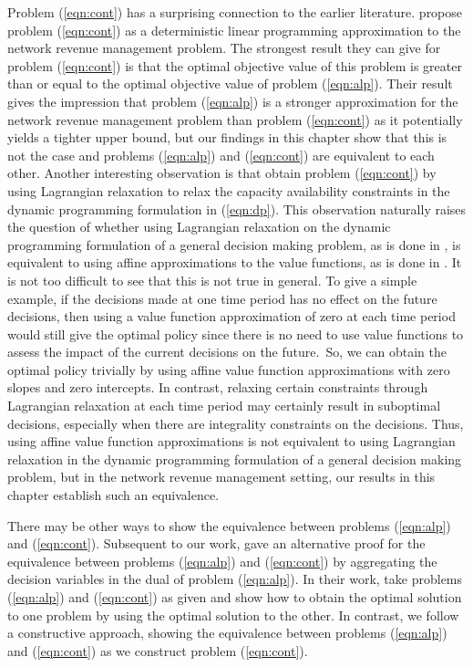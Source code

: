 Problem (\ref{eqn:cont}) has a surprising connection to the earlier literature.  propose problem (\ref{eqn:cont}) as a deterministic linear programming approximation to the network revenue management problem. The strongest result they can give for problem (\ref{eqn:cont}) is that the optimal objective value of this problem is greater than or equal to the optimal objective value of problem (\ref{eqn:alp}). Their result gives the impression that problem (\ref{eqn:alp}) is a stronger approximation for the network revenue management problem than problem (\ref{eqn:cont}) as it potentially yields a tighter upper bound, but our findings in this chapter show that this is not the case and problems (\ref{eqn:alp}) and (\ref{eqn:cont}) are equivalent to each other. Another interesting observation is that  obtain problem (\ref{eqn:cont}) by using Lagrangian relaxation to relax the capacity availability constraints in the dynamic programming formulation in (\ref{eqn:dp}). This observation naturally raises the question of whether using Lagrangian relaxation on the dynamic programming formulation of a general decision making problem, as is done in , is equivalent to using affine approximations to the value functions, as is done in . It is not too difficult to see that this is not true in general. To give a simple example, if the decisions made at one time period has no effect on the future decisions, then using a value function approximation of zero at each time period would still give the optimal policy since there is no need to use value functions to assess the impact of the current decisions on the future.~So, we can obtain the optimal policy trivially by using affine value function approximations with zero slopes and zero intercepts. In contrast, relaxing certain constraints through Lagrangian relaxation at each time period may certainly result in suboptimal decisions, especially when there are integrality constraints on the decisions. Thus, using affine value function approximations is not equivalent to using Lagrangian relaxation in the dynamic programming formulation of a general decision making problem, but in the network revenue management setting, our results in this chapter establish such an equivalence.

There may be other ways to show the equivalence between problems (\ref{eqn:alp}) and (\ref{eqn:cont}). Subsequent to our work,  gave an alternative proof for the equivalence  between problems (\ref{eqn:alp}) and (\ref{eqn:cont}) by aggregating the decision variables in the dual of problem (\ref{eqn:alp}). In their work,  take problems (\ref{eqn:alp}) and (\ref{eqn:cont}) as given and show how to obtain the optimal solution to one problem by using the optimal solution to the other. In contrast, we follow a constructive approach, showing the equivalence between problems (\ref{eqn:alp}) and (\ref{eqn:cont}) as we construct problem (\ref{eqn:cont}).



